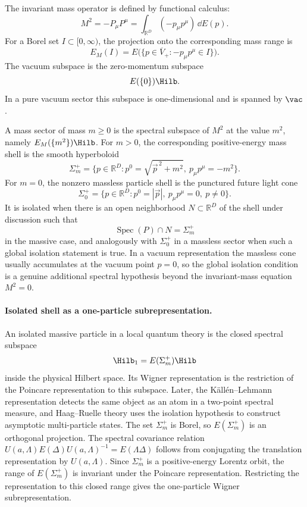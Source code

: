 \begin{definition}
\label{def:invariant-mass-spectral-measure}
The invariant mass operator is defined by functional calculus:
\[
  M^2=-P_\mu P^\mu
  =
  \int_{\mathbb R^D}(-p_\mu p^\mu)\,\dd E(p).
\]
For a Borel set \(I\subset[0,\infty)\), the projection onto the corresponding
mass range is
\[
  E_M(I)
  =
  E\bigl(\{p\in\overline V_+:-p_\mu p^\mu\in I\}\bigr).
\]
The vacuum subspace is the zero-momentum subspace
\[
  E(\{0\})\Hilb .
\]
In a pure vacuum sector this subspace is one-dimensional and is spanned by
\(\vac\).
\end{definition}

\begin{definition}
\label{def:mass-sector-and-particle-shell}
  A mass sector of mass \(m\ge0\) is the spectral subspace of \(M^2\) at the
  value \(m^2\), namely \(E_M(\{m^2\})\Hilb\).  For \(m>0\), the corresponding
  positive-energy mass shell is the smooth hyperboloid
  \[
    \Sigma_m^+
    =
    \{p\in\mathbb R^D:p^0=\sqrt{\vec p^{\,2}+m^2},\ p_\mu p^\mu=-m^2\}.
  \]
  For \(m=0\), the nonzero massless particle shell is the punctured future
  light cone
  \[
    \Sigma_0^+
    =
    \{p\in\mathbb R^D:p^0=|\vec p|,\ p_\mu p^\mu=0,\ p\ne0\}.
  \]
  It is isolated when there is an open neighborhood \(N\subset\mathbb R^D\) of
  the shell under discussion such that
  \[
    \operatorname{Spec}(P)\cap N=\Sigma_m^+
  \]
  in the massive case, and analogously with \(\Sigma_0^+\) in a massless
  sector when such a global isolation statement is true.  In a vacuum
  representation the massless cone usually accumulates at the vacuum point
  \(p=0\), so the global isolation condition is a genuine additional spectral
  hypothesis beyond the invariant-mass equation \(M^2=0\).
\end{definition}

\paragraph{Isolated shell as a one-particle subrepresentation.}
An isolated massive particle in a local quantum theory is the closed spectral
subspace
\[
  \Hilb_1=E(\Sigma_m^+)\Hilb
\]
inside the physical Hilbert space.  Its Wigner representation is the
restriction of the Poincare representation to this subspace.  Later, the
K\"all\'en--Lehmann representation detects the same object as an atom in a
two-point spectral measure, and Haag--Ruelle theory uses the isolation
hypothesis to construct asymptotic multi-particle states.
The set \(\Sigma_m^+\) is Borel, so \(E(\Sigma_m^+)\) is an orthogonal
projection.  The spectral covariance relation
\(U(a,\Lambda)E(\Delta)U(a,\Lambda)^{-1}=E(\Lambda\Delta)\) follows from
conjugating the translation representation by \(U(a,\Lambda)\).  Since
\(\Sigma_m^+\) is a positive-energy Lorentz orbit, the range of
\(E(\Sigma_m^+)\) is invariant under the Poincare representation.  Restricting
the representation to this closed range gives the one-particle Wigner
subrepresentation.

